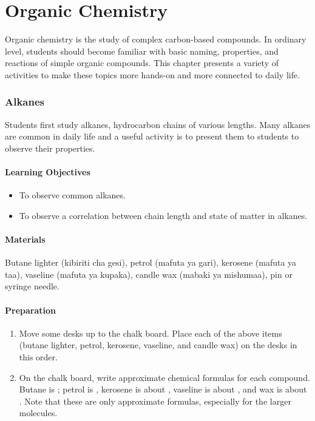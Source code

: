 \chapter{Organic Chemistry}

Organic chemistry is the study of complex carbon-based compounds. In ordinary level, students should become familiar with basic naming, properties, and reactions of simple organic compounds. This chapter presents a variety of activities to make these topics more hands-on and more connected to daily life.

\subsection{Alkanes}

Students first study alkanes, hydrocarbon chains of various lengths. Many alkanes are common in daily life and a useful activity is to present them to students to observe their properties.

\subsubsection*{Learning Objectives}
\begin{itemize}
\item{To observe common alkanes.}
\item{To observe a correlation between chain length and state of matter in alkanes.}
\end{itemize}

\subsubsection*{Materials}
Butane lighter (kibiriti cha gesi), petrol (mafuta ya gari), kerosene (mafuta ya taa), vaseline (mafuta ya kupaka), candle wax (mabaki ya mishumaa), pin or syringe needle.

\subsubsection*{Preparation}
\begin{enumerate}
\item{Move some desks up to the chalk board. Place each of the above items (butane lighter, petrol, kerosene, vaseline, and candle wax) on the desks in this order.}
\item{On the chalk board, write approximate chemical formulas for each compound. Butane is ; petrol is , kerosene is about , vaseline is about , and wax is about . Note that these are only approximate formulas, especially for the larger molecules.}
\end{enumerate}

